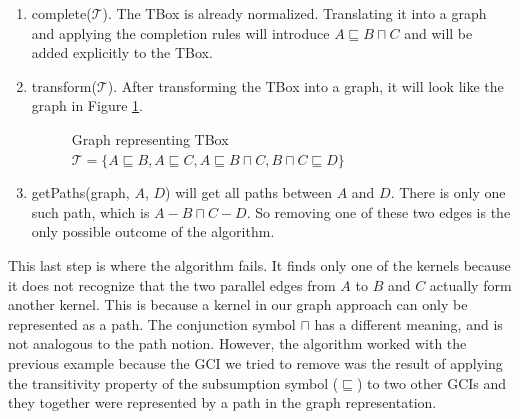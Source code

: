 \begin{enumerate}
\item complete($\mathcal{T}$). 
The TBox is already normalized. Translating it into a graph and applying the completion rules will introduce $A \sqsubseteq B \sqcap C$ and will be added explicitly to the TBox.
\item transform($\mathcal{T}$).
After transforming the TBox into a graph, it will look like the graph in Figure \ref{fig:abcbc-kb}.

\begin{figure}
\centering
{}
\caption{Graph representing TBox $\mathcal{T} = \lbrace A \sqsubseteq B, A \sqsubseteq C, A \sqsubseteq B \sqcap C, B \sqcap C \sqsubseteq D \rbrace $}
\label{fig:abcbc-kb}
\end{figure}

\item getPaths(graph, $A$, $D$) will get all paths between $A$ and $D$. There is only one such path, which is $A - B \sqcap C - D$. So removing one of these two edges is the only possible outcome of the algorithm.
\end{enumerate}

This last step is where the algorithm fails. It finds only one of the kernels because it does not recognize that the two parallel edges from $A$ to $B$ and $C$ actually form another kernel. This is because a kernel in our graph approach can only be represented as a path. The conjunction symbol $\sqcap$ has a different meaning, and is not analogous to the path notion. However, the algorithm worked with the previous example because the GCI we tried to remove was the result of applying the transitivity property of the subsumption symbol ($\sqsubseteq$) to two other GCIs and they together were represented by a path in the graph representation.

